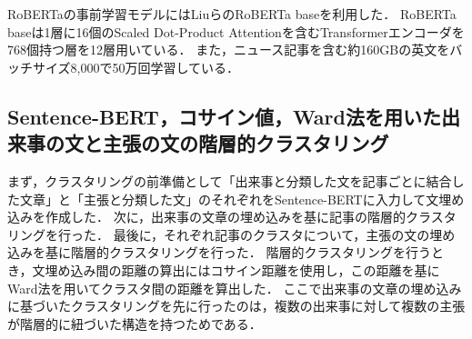 \documentclass[12pt,a4j]{jreport}
\begin{document}
RoBERTaの事前学習モデルにはLiuらのRoBERTa baseを利用した\cite{liu_roberta_2019}．
RoBERTa baseは1層に16個のScaled Dot-Product Attentionを含むTransformerエンコーダを768個持つ層を12層用いている．
また，ニュース記事を含む約160GBの英文をバッチサイズ8,000で50万回学習している．



\subsection{Sentence-BERT，コサイン値，Ward法を用いた出来事の文と主張の文の階層的クラスタリング}

まず，クラスタリングの前準備として「出来事と分類した文を記事ごとに結合した文章」と「主張と分類した文」のそれぞれをSentence-BERTに入力して文埋め込みを作成した．
次に，出来事の文章の埋め込みを基に記事の階層的クラスタリングを行った．
最後に，それぞれ記事のクラスタについて，主張の文の埋め込みを基に階層的クラスタリングを行った．
階層的クラスタリングを行うとき，文埋め込み間の距離の算出にはコサイン距離を使用し，この距離を基にWard法を用いてクラスタ間の距離を算出した．
ここで出来事の文章の埋め込みに基づいたクラスタリングを先に行ったのは，複数の出来事に対して複数の主張が階層的に紐づいた構造を持つためである．
\end{document}
